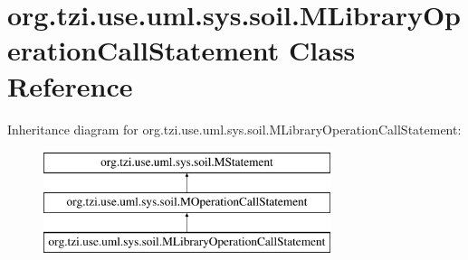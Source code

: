 \hypertarget{classorg_1_1tzi_1_1use_1_1uml_1_1sys_1_1soil_1_1_m_library_operation_call_statement}{\section{org.\-tzi.\-use.\-uml.\-sys.\-soil.\-M\-Library\-Operation\-Call\-Statement Class Reference}
\label{classorg_1_1tzi_1_1use_1_1uml_1_1sys_1_1soil_1_1_m_library_operation_call_statement}
}
Inheritance diagram for org.\-tzi.\-use.\-uml.\-sys.\-soil.\-M\-Library\-Operation\-Call\-Statement\-:\begin{figure}[H]
\begin{center}
\leavevmode
\includegraphics[height=3.000000cm]{classorg_1_1tzi_1_1use_1_1uml_1_1sys_1_1soil_1_1_m_library_operation_call_statement}
\end{center}
\end{figure}
